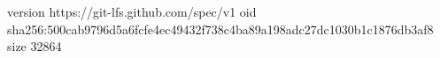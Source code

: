version https://git-lfs.github.com/spec/v1
oid sha256:500cab9796d5a6fcfe4ec49432f738c4ba89a198adc27dc1030b1c1876db3af8
size 32864
